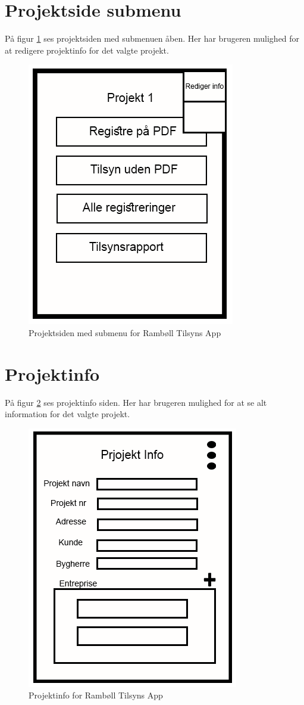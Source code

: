 \section{Projektside submenu}\label{sec:ProjektsideSubMock}
På figur \ref{fig:ProjektsideSubMock} ses projektsiden med submenuen åben. Her har brugeren mulighed for at redigere projektinfo for det valgte projekt.

\begin{figure}[H]
	\centering
	\includegraphics[width=0.4\linewidth]{MockUps/Mock/Ramboell-Registrer-sub}
	\caption{Projektsiden med submenu for Rambøll Tilsyns App}
	\label{fig:ProjektsideSubMock}
\end{figure}

\section{Projektinfo}\label{sec:ProjektinfoMock}
På figur \ref{fig:ProjektinfoMock} ses projektinfo siden. Her har brugeren mulighed for at se alt information for det valgte projekt.

\begin{figure}[H]
	\centering
	\includegraphics[width=0.4\linewidth]{MockUps/Mock/Ramboell-ProjektInfo}
	\caption{Projektinfo for Rambøll Tilsyns App}
	\label{fig:ProjektinfoMock}
\end{figure}

